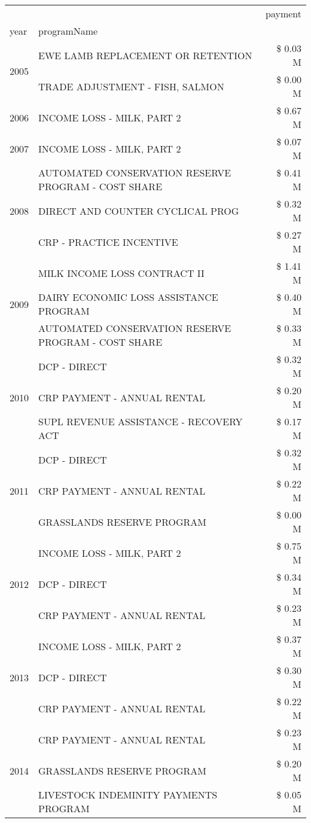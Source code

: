 \begin{tabular}{llr}
\toprule
 &  & payment \\
year & programName &  \\
\midrule
\multirow[t]{2}{*}{2005} & EWE LAMB REPLACEMENT OR RETENTION & \$ 0.03 M \\
 & TRADE ADJUSTMENT - FISH, SALMON & \$ 0.00 M \\
\cline{1-3}
2006 & INCOME LOSS - MILK, PART 2 & \$ 0.67 M \\
\cline{1-3}
2007 & INCOME LOSS - MILK, PART 2 & \$ 0.07 M \\
\cline{1-3}
\multirow[t]{3}{*}{2008} & AUTOMATED CONSERVATION RESERVE PROGRAM - COST SHARE & \$ 0.41 M \\
 & DIRECT AND COUNTER CYCLICAL PROG & \$ 0.32 M \\
 & CRP - PRACTICE INCENTIVE & \$ 0.27 M \\
\cline{1-3}
\multirow[t]{3}{*}{2009} & MILK INCOME LOSS CONTRACT II & \$ 1.41 M \\
 & DAIRY ECONOMIC LOSS ASSISTANCE PROGRAM & \$ 0.40 M \\
 & AUTOMATED CONSERVATION RESERVE PROGRAM - COST SHARE & \$ 0.33 M \\
\cline{1-3}
\multirow[t]{3}{*}{2010} & DCP - DIRECT & \$ 0.32 M \\
 & CRP PAYMENT - ANNUAL RENTAL & \$ 0.20 M \\
 & SUPL REVENUE ASSISTANCE - RECOVERY ACT & \$ 0.17 M \\
\cline{1-3}
\multirow[t]{3}{*}{2011} & DCP - DIRECT & \$ 0.32 M \\
 & CRP PAYMENT - ANNUAL RENTAL & \$ 0.22 M \\
 & GRASSLANDS RESERVE PROGRAM & \$ 0.00 M \\
\cline{1-3}
\multirow[t]{3}{*}{2012} & INCOME LOSS - MILK, PART 2 & \$ 0.75 M \\
 & DCP - DIRECT & \$ 0.34 M \\
 & CRP PAYMENT - ANNUAL RENTAL & \$ 0.23 M \\
\cline{1-3}
\multirow[t]{3}{*}{2013} & INCOME LOSS - MILK, PART 2 & \$ 0.37 M \\
 & DCP - DIRECT & \$ 0.30 M \\
 & CRP PAYMENT - ANNUAL RENTAL & \$ 0.22 M \\
\cline{1-3}
\multirow[t]{3}{*}{2014} & CRP PAYMENT - ANNUAL RENTAL & \$ 0.23 M \\
 & GRASSLANDS RESERVE PROGRAM & \$ 0.20 M \\
 & LIVESTOCK INDEMINITY PAYMENTS PROGRAM & \$ 0.05 M \\

\end{tabular}
